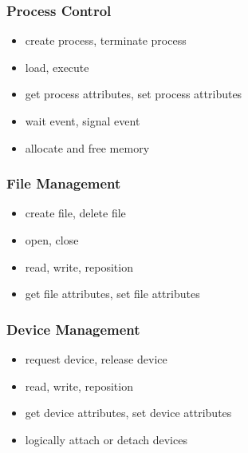 \documentclass{article}
\begin{document}
\subsubsection{Process Control}



\begin{itemize}
    \item create process, terminate process
    \item load, execute
    \item get process attributes, set process attributes
    \item wait event, signal event
    \item allocate and free memory
\end{itemize}
\subsubsection{File Management}
\begin{itemize}
    \item create file, delete file
    \item open, close
    \item read, write, reposition
    \item get file attributes, set file attributes
\end{itemize}
\subsubsection{Device Management}
\begin{itemize}
    \item request device, release device
    \item read, write, reposition
    \item get device attributes, set device attributes
    \item logically attach or detach devices
\end{itemize}
\end{document}
